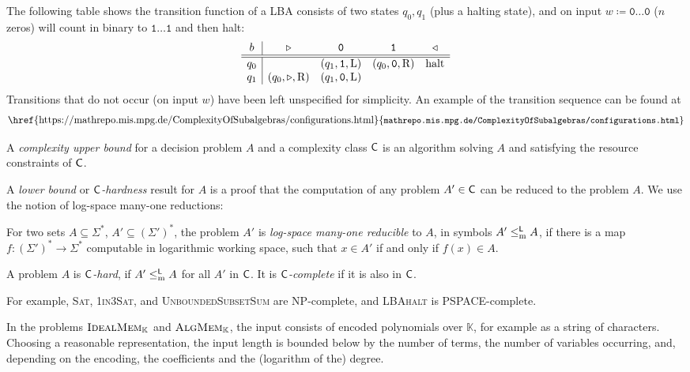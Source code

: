 \documentclass[12pt]{article}
\newcommand{\KK}{\mathbb{K}}
\newcommand{\NULL}{\texttt{0}}
\newcommand{\EINS}{\texttt{1}}
\newcommand{\problemText}[1]{\textsc{#1}\xspace}
\newcommand{\IdealMem}{\problemText{IdealMem}}
\newcommand{\AlgMem}{\problemText{AlgMem}}
\newcommand{\OneInThreeSAT}{\problemText{1in3Sat}}
\newcommand{\SubsetSum}{\problemText{UnboundedSubsetSum}}
\newcommand{\LBAhalt}{\problemText{LBAhalt}}
\newcommand{\cclass}[1]{\textsf{\textup{#1}}\xspace}
\newcommand{\NP}{\cclass{NP}}
\newcommand{\PSPACE}{\cclass{PSPACE}}
\newcommand{\leqlm}{\mathrel{\leq^{\cclass{L}}_{\textup{m}}}}
\begin{document}
\begin{example}\label{exa:binaryLBA}
  The following table shows the transition function of a LBA consists of two states $q_0,q_1$ (plus a halting state), and on input $w \coloneqq \NULL\dots \NULL$ ($n$ zeros) will count in binary to $\EINS \dots \EINS$ and then halt:
  \[
  \begin{array}{c|cccc}
  b & {\triangleright}               & \NULL               & \EINS               & {\triangleleft} \\ \hline \hline
  q_0 &                                & (q_1,\EINS,{\rm L}) & (q_0,\NULL,{\rm R}) & \text{halt}      \\
  q_1 & (q_0,{\triangleright},{\rm R}) & (q_1,\NULL,{\rm L}) &                     &
  \end{array}
  \]
Transitions that do not occur (on input $w$) have been left unspecified for simplicity. An example of the transition sequence can be found at
\[
\text{\href{https://mathrepo.mis.mpg.de/ComplexityOfSubalgebras/configurations.html}{\small \texttt{mathrepo.mis.mpg.de/ComplexityOfSubalgebras/configurations.html}}}
\]
\end{example}

\begin{definition}
A \emph{complexity upper bound} for a decision problem $A$ and a complexity class $\cclass C$ is an algorithm solving $A$ and satisfying the resource constraints of $\cclass C$.
\end{definition}
A \emph{lower bound} or $\cclass C$\emph{-hardness} result for $A$ is a proof that the computation of any problem $A' \in \cclass C$ can be reduced to the problem $A$. We use the notion of log-space many-one reductions:
\begin{definition}
For two sets $A\subseteq \Sigma^*$, $A' \subseteq (\Sigma')^*$, the problem $A'$ is \emph{log-space many-one reducible} to $A$, in symbols $A' \leqlm A$, if there is a map $f\colon (\Sigma')^*\to \Sigma^*$ computable in logarithmic working space, such that $x \in A'$ if and only if $f(x) \in A$.

A problem $A$ is \emph{$\cclass C$-hard}, if $A' \leqlm A$ for all $A'$ in $\cclass C$. It is \emph{$\cclass C$-complete} if it is also in $\cclass C$.
\end{definition}
For example, \problemText{Sat}, \OneInThreeSAT, and \SubsetSum are \NP-complete, and \LBAhalt is \PSPACE-complete.

In the problems $\IdealMem_\KK$ and $\AlgMem_\KK$, the input consists of encoded polynomials over $\KK$, for example as a string of characters. Choosing a reasonable representation, the input length is bounded below by the number of terms, the number of variables occurring, and, depending on the encoding, the coefficients and the (logarithm of the) degree.
\end{document}
